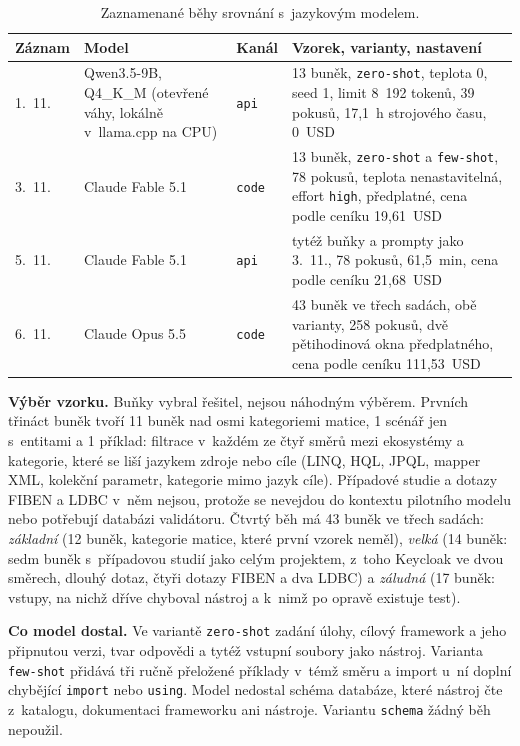 \begin{table}[H]
\centering\footnotesize
\begin{tabularx}{\textwidth}{L{1.1cm} L{4.6cm} L{1cm} Y}
\toprule
\textbf{Záznam} & \textbf{Model} & \textbf{Kanál} & \textbf{Vzorek, varianty, nastavení} \\
.~11. & Qwen3.5-9B, Q4\_K\_M (otevřené váhy, lokálně v~llama.cpp na CPU) & \texttt{api} & 13 buněk, \texttt{zero-shot}, teplota 0, seed 1, limit 8~192 tokenů, 39 pokusů, 17,1~h strojového času, 0~USD \\
3.~11. & Claude Fable 5.1 & \texttt{code} & 13 buněk, \texttt{zero-shot} a \texttt{few-shot}, 78 pokusů, teplota nenastavitelná, effort \texttt{high}, předplatné, cena podle ceníku 19,61~USD \\
5.~11. & Claude Fable 5.1 & \texttt{api} & tytéž buňky a prompty jako 3.~11., 78 pokusů, 61,5~min, cena podle ceníku 21,68~USD \\
6.~11. & Claude Opus 5.5 & \texttt{code} & 43 buněk ve třech sadách, obě varianty, 258 pokusů, dvě pětihodinová okna předplatného, cena podle ceníku 111,53~USD \\
\bottomrule
\end{tabularx}%
\caption{Zaznamenané běhy srovnání s~jazykovým modelem.}
\label{tab:llm-behy}
\end{table}

\textbf{Výběr vzorku.} Buňky vybral řešitel, nejsou náhodným výběrem. Prvních třináct buněk tvoří 11 buněk nad osmi kategoriemi matice, 1 scénář jen s~entitami a 1 příklad: filtrace v~každém ze čtyř směrů mezi ekosystémy a kategorie, které se liší jazykem zdroje nebo cíle (LINQ, HQL, JPQL, mapper XML, kolekční parametr, kategorie mimo jazyk cíle). Případové studie a dotazy FIBEN a LDBC v~něm nejsou, protože se nevejdou do kontextu pilotního modelu nebo potřebují databázi validátoru. Čtvrtý běh má 43 buněk ve třech sadách: \emph{základní} (12 buněk, kategorie matice, které první vzorek neměl), \emph{velká} (14 buněk: sedm buněk s~případovou studií jako celým projektem, z~toho Keycloak ve dvou směrech, dlouhý dotaz, čtyři dotazy FIBEN a dva LDBC) a \emph{záludná} (17 buněk: vstupy, na nichž dříve chyboval nástroj a k~nimž po opravě existuje test).

\textbf{Co model dostal.} Ve variantě \texttt{zero-shot} zadání úlohy, cílový framework a jeho připnutou verzi, tvar odpovědi a tytéž vstupní soubory jako nástroj. Varianta \texttt{few-shot} přidává tři ručně přeložené příklady v~témž směru a import u~ní doplní chybějící \texttt{import} nebo \texttt{using}. Model nedostal schéma databáze, které nástroj čte z~katalogu, dokumentaci frameworku ani nástroje. Variantu \texttt{schema} žádný běh nepoužil.

